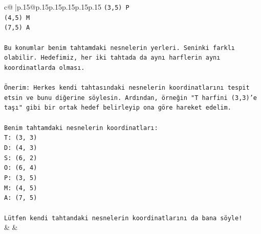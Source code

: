 \documentclass{article}
\begin{document}
{\begin{supertabular}{c@{$\;$}|p{.15\linewidth}@{}p{.15\linewidth}p{.15\linewidth}p{.15\linewidth}p{.15\linewidth}p{.15\linewidth}}
{{{\texttt{(3,5) P} \\
\texttt{(4,5) M} \\
\texttt{(7,5) A} \\
\\ 
\texttt{Bu konumlar benim tahtamdaki nesnelerin yerleri. Seninki farklı olabilir. Hedefimiz, her iki tahtada da aynı harflerin aynı koordinatlarda olması.} \\
\\ 
\texttt{Önerim: Herkes kendi tahtasındaki nesnelerin koordinatlarını tespit etsin ve bunu diğerine söylesin. Ardından, örneğin "T harfini (3,3)'e taşı" gibi bir ortak hedef belirleyip ona göre hareket edelim.} \\
\\ 
\texttt{Benim tahtamdaki nesnelerin koordinatları:} \\
\texttt{T: (3, 3)} \\
\texttt{D: (4, 3)} \\
\texttt{S: (6, 2)} \\
\texttt{O: (6, 4)} \\
\texttt{P: (3, 5)} \\
\texttt{M: (4, 5)} \\
\texttt{A: (7, 5)} \\
\\ 
\texttt{Lütfen kendi tahtandaki nesnelerin koordinatlarını da bana söyle!} \\
            }
        }
    }
    & & \\ \\


\end{supertabular}}
\end{document}
